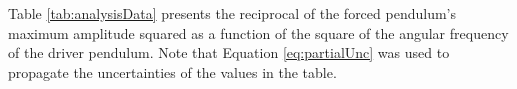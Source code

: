 \documentclass[letterpaper, 12pt]{article}
\begin{document}
Table \ref*{tab:analysisData} presents the reciprocal of the forced
pendulum's maximum amplitude squared as a function of the
square of the angular frequency of the driver pendulum.
Note that Equation \ref*{eq:partialUnc} was used to
propagate the uncertainties of the values in the table.

\end{document}
